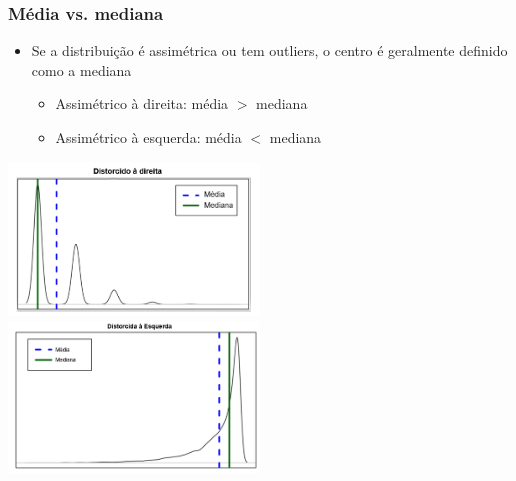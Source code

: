 \begin{frame}
\frametitle{Média vs. mediana}

\begin{itemize}
\justifying
\item Se a distribuição é assimétrica ou tem outliers, o centro é geralmente definido como a mediana
\begin{itemize}
\item Assimétrico à direita: média $>$ mediana
\item Assimétrico à esquerda: média $<$ mediana \\
\end{itemize}

\end{itemize}

\begin{center}
\includegraphics[width=0.5\textwidth]{1-6_numerical_data/rs.png}
\includegraphics[width=0.5\textwidth]{1-6_numerical_data/ls.png}\\
\end{center}

\end{frame}


